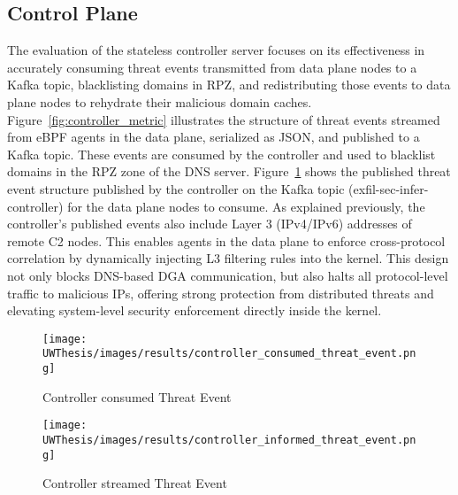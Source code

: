 \documentclass [11pt, proquest] {uwthesis}[2020/02/24]
\begin{document}
\subsection{Control Plane}
The evaluation of the stateless controller server focuses on its effectiveness in accurately consuming threat events transmitted from data plane nodes to a Kafka topic, blacklisting domains in RPZ, and redistributing those events to data plane nodes to rehydrate their malicious domain caches. Figure~\ref{fig:controller_metric} illustrates the structure of threat events streamed from eBPF agents in the data plane, serialized as JSON, and published to a Kafka topic. These events are consumed by the controller and used to blacklist domains in the RPZ zone of the DNS server. Figure~\ref{fig:controller_aware_metric} shows the published threat event structure published by the controller on the Kafka topic (exfil-sec-infer-controller) for the data plane nodes to consume. As explained previously, the controller’s published events also include Layer 3 (IPv4/IPv6) addresses of remote C2 nodes. This enables agents in the data plane to enforce cross-protocol correlation by dynamically injecting L3 filtering rules into the kernel. This design not only blocks DNS-based DGA communication, but also halts all protocol-level traffic to malicious IPs, offering strong protection from distributed threats and elevating system-level security enforcement directly inside the kernel.


\begin{figure}[H]
  \centering
  \begin{minipage}[t]{0.47\textwidth}
    \centering
    \texttt{[image: UWThesis/images/results/controller\_consumed\_threat\_event.png]}
\caption{Controller consumed Threat Event}
  \label{fig:controller_metric}
  \end{minipage}
  \hfill
  \begin{minipage}[t]{0.47\textwidth}
    \centering
    \texttt{[image: UWThesis/images/results/controller\_informed\_threat\_event.png]}
    \caption{Controller streamed Threat Event}
     \label{fig:controller_aware_metric}
  \end{minipage}
\end{figure}
\end{document}
